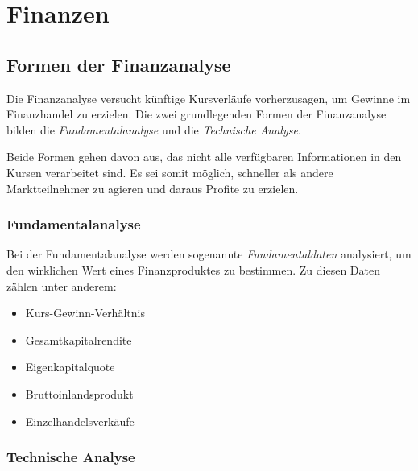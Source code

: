 \section{Finanzen}
\author{Dennis Kempf, Moritz Hollenberg, Patrice Becker}

\subsection{Formen der Finanzanalyse}
\author{Dennis Kempf}

Die Finanzanalyse versucht künftige Kursverläufe vorherzusagen, um Gewinne im Finanzhandel zu erzielen. Die zwei grundlegenden Formen der Finanzanalyse bilden die \emph{Fundamentalanalyse} und die \emph{Technische Analyse}. 

Beide Formen gehen davon aus, das nicht alle verfügbaren Informationen in den Kursen verarbeitet sind. Es sei somit möglich, schneller als andere Marktteilnehmer zu agieren und daraus Profite zu erzielen.

\subsubsection{Fundamentalanalyse}
\author{Dennis Kempf}
Bei der Fundamentalanalyse werden sogenannte \emph{Fundamentaldaten} analysiert, um den wirklichen Wert eines Finanzproduktes zu bestimmen. Zu diesen Daten zählen unter anderem:\\ 

\begin{itemize}
	\item Kurs-Gewinn-Verhältnis
	\item Gesamtkapitalrendite
	\item Eigenkapitalquote
	\item Bruttoinlandsprodukt
	\item Einzelhandelsverkäufe
\end{itemize}

\subsubsection{Technische Analyse}
\author{Dennis Kempf}